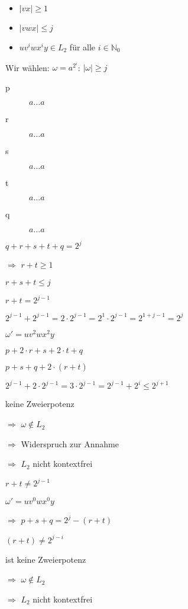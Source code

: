 \documentclass{bschlangaul-aufgabe}
\begin{document}
\begin{enumerate}
\begin{liAntwort}
\begin{itemize}
\item $|vx| \geq 1$
\item $|vwx| \leq j$
\item $u v^i w x^i y \in L_2$ für alle $i \in \mathbb{N}_0$
\end{itemize}

Wir wählen: $\omega = a^{2^i}$: $|\omega| \geq j$

\begin{description}
\item[p] $a \dots a$
\item[r] $a \dots a$
\item[s] $a \dots a$
\item[t] $a \dots a$
\item[q] $a \dots a$
\end{description}

$q + r + s + t + q = 2^j$

$\Rightarrow$ $r + t \geq 1$

$r + s + t \leq j$

%


$r + t = 2^{j-1}$

$2^{j-1} + 2^{j-1} = 2 \cdot 2^{j-1} =  2^1 \cdot 2^{j-1} =  2^{1+j-1} = 2^j$

$\omega' = u v^2 w x^2 y$

$p + 2 \cdot r + s + 2 \cdot t + q$

$p + s + q + 2 \cdot (r + t)$

$2^{j-1} + 2 \cdot 2^{j-1} = 3 \cdot 2^{j-1} = 2^{j-1} + 2^i \leq 2^{j+1}$

keine Zweierpotenz

$\Rightarrow$ $\omega \notin L_2$

$\Rightarrow$ Widerspruch zur Annahme

$\Rightarrow$ $L_2$ nicht kontextfrei

%


$r + t \neq 2^{j-1}$

$\omega' = u v^0 w x^0 y$

$\Rightarrow$ $p + s + q = 2^j - (r + t)$

$(r + t) \neq 2^{j-i}$

ist keine Zweierpotenz

$\Rightarrow$ $\omega \notin L_2$

$\Rightarrow$ $L_2$ nicht kontextfrei

\end{liAntwort}

\end{enumerate}
\end{document}
